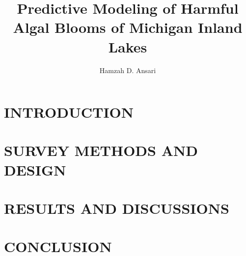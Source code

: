 \documentclass{ou-thesis}
\begin{document}
\graphicspath{{./figures/}}
\title{Predictive Modeling of Harmful Algal Blooms of Michigan Inland Lakes}
\author{Hamzah D. Ansari}
\dedication{I dedicate this thesis to Carl Sagan who greatly inspired my ambition to think critically and meticulous, ultimately leading me to hone my skills in the pursuit of science. The memory of his voice will forever echo within my conscious}
\makefrontmatter
\renewcommand{\bibname}{REFERENCES}
\chapter{INTRODUCTION}
\setlength{\parindent}{.5 in}
\raggedright\setlength{\parindent}{.5 in}



\chapter{SURVEY METHODS AND DESIGN}
\setlength{\parindent}{.5 in}
\raggedright\setlength{\parindent}{.5 in}



\chapter{RESULTS AND DISCUSSIONS}
\setlength{\parindent}{.5 in}
\raggedright\setlength{\parindent}{.5 in}



\chapter{CONCLUSION}
\setlength{\parindent}{.5 in}
\raggedright\setlength{\parindent}{.5 in}



\clearpage
\newpage



\begin{appendix}
 \label{spattss}







%


%

\end{appendix}
\end{document}
